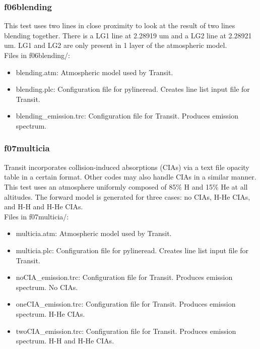 \documentclass[letterpaper, 12pt]{article}
\begin{document}
\subsubsection{f06blending}
\label{sec:blending}
This test uses two lines in close proximity to look at the 
result of two lines blending together. There is a LG1 line at 2.28919 um 
and a LG2 line at 2.28921 um. LG1 and LG2 are only present in 1 layer of 
the atmospheric model.\\

Files in f06blending/:
\begin{itemize} \itemsep0pt
  \item blending.atm: Atmospheric model used by Transit.
  \item blending.plc: Configuration file for pylineread. Creates 
        line list input file for Transit.
  \item blending{\_}emission.trc: Configuration file for Transit. Produces 
        emission spectrum.
\end{itemize}

\subsubsection{f07multicia}
\label{sec:multicia}
Transit incorporates collision-induced absorptions (CIAs) via a text file 
opacity table in a certain format. Other codes may also handle CIAs in a 
similar manner. This test uses an atmosphere uniformly composed of 85\% H 
and 15\% He at all altitudes. The forward model is generated for three cases: 
no CIAs, H-He CIAs, and H-H and H-He CIAs.\\

Files in f07multicia/:
\begin{itemize} \itemsep0pt
  \item multicia.atm: Atmospheric model used by Transit.
  \item multicia.plc: Configuration file for pylineread. Creates 
        line list input file for Transit.
  \item noCIA{\_}emission.trc: Configuration file for Transit. Produces 
        emission spectrum. No CIAs.
  \item oneCIA{\_}emission.trc: Configuration file for Transit. Produces 
        emission spectrum. H-He CIAs.
  \item twoCIA{\_}emission.trc: Configuration file for Transit. Produces 
        emission spectrum. H-H and H-He CIAs.
\end{itemize}
\end{document}

